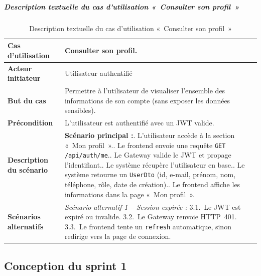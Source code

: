 \subparagraph{Description textuelle du cas d'utilisation «~Consulter son profil~»}

\begin{table}[H]
  \caption{Description textuelle du cas d'utilisation «~Consulter son profil~»}
  \label{tab:cu-consulter-profil}
  \centering
  \begin{tabularx}{\textwidth}{|L{3.8cm}|X|}
    \hline
    \textbf{Cas d'utilisation} & Consulter son profil. \\
    \hline
    \textbf{Acteur initiateur} & Utilisateur authentifié \\
    \hline
    \textbf{But du cas} & Permettre à l'utilisateur de visualiser l'ensemble des informations de son compte (sans exposer les données sensibles). \\
    \hline
    \textbf{Précondition} & L'utilisateur est authentifié avec un JWT valide. \\
    \hline
    \textbf{Description du scénario} &
    \textbf{Scénario principal :}. L'utilisateur accède à la section «~Mon profil~».. Le frontend envoie une requête \texttt{GET /api/auth/me}.. Le Gateway valide le JWT et propage l'identifiant.. Le système récupère l'utilisateur en base.. Le système retourne un \texttt{UserDto} (id, e-mail, prénom, nom, téléphone, rôle, date de création).. Le frontend affiche les informations dans la page «~Mon profil~».\\
    \hline
    \textbf{Scénarios alternatifs} &
    \textit{Scénario alternatif 1 -- Session expirée :}\newline
    \hspace*{6pt}3.1.~Le JWT est expiré ou invalide.\newline
    \hspace*{6pt}3.2.~Le Gateway renvoie HTTP~401.\newline
    \hspace*{6pt}3.3.~Le frontend tente un \texttt{refresh} automatique, sinon redirige vers la page de connexion.\\
    \hline
  \end{tabularx}
\end{table}

\subsection{Conception du sprint 1}

